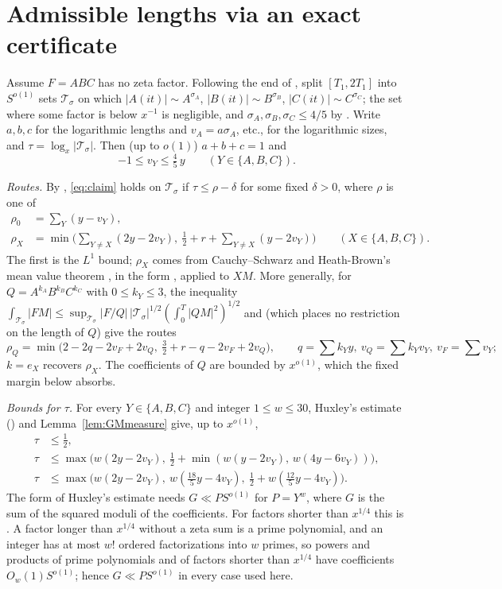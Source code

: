 \documentclass[11pt]{amsart}
\theoremstyle{definition}
\theoremstyle{remark}
\begin{document}
\section{Admissible lengths via an exact certificate}\label{sec:ranges}

Assume $F=ABC$ has no zeta factor. Following the end of \cite[Section~5]{J}, split $[T_1,2T_1]$ into $S^{o(1)}$ sets $\mathcal T_\sigma$ on which $|A(it)|\sim A^{\sigma_A}$, $|B(it)|\sim B^{\sigma_B}$, $|C(it)|\sim C^{\sigma_C}$; the set where some factor is below $x^{-1}$ is negligible, and $\sigma_A,\sigma_B,\sigma_C\le 4/5$ by \cite[Lemma~5.8]{J}. Write $a,b,c$ for the logarithmic lengths and $v_A=a\sigma_A$, etc., for the logarithmic sizes, and $\tau=\log_x|\mathcal T_\sigma|$. Then (up to $o(1)$) $a+b+c=1$ and
\begin{equation}\label{eq:domain}
-1\le v_Y\le \tfrac45\,y\qquad(Y\in\{A,B,C\}).
\end{equation}

\emph{Routes.} By \cite[(5.7), (5.8)]{J}, \eqref{eq:claim} holds on $\mathcal T_\sigma$ if $\tau\le \rho-\delta$ for some fixed $\delta>0$, where $\rho$ is one of
\begin{align*}
\rho_0&=\textstyle\sum_{Y}(y-v_Y),\\
\rho_X&=\min\Big(\textstyle\sum_{Y\ne X}(2y-2v_Y),\ \tfrac12+r+\sum_{Y\ne X}(y-2v_Y)\Big)\qquad(X\in\{A,B,C\}).
\end{align*}
The first is the $L^1$ bound; $\rho_X$ comes from Cauchy--Schwarz and Heath-Brown's mean value theorem \cite{HB-MVT}, in the form \cite[Proposition~2.2]{J}, applied to $XM$. More generally, for $Q=A^{k_A}B^{k_B}C^{k_C}$ with $0\le k_Y\le 3$, the inequality $\int_{\mathcal T_\sigma}|FM|\le\sup_{\mathcal T_\sigma}|F/Q|\,|\mathcal T_\sigma|^{1/2}(\int_0^T|QM|^2)^{1/2}$ and \cite[Proposition~2.2]{J} (which places no restriction on the length of $Q$) give the routes
\[
\rho_Q=\min\big(2-2q-2v_F+2v_Q,\ \tfrac32+r-q-2v_F+2v_Q\big),\qquad q=\textstyle\sum k_Yy,\ v_Q=\sum k_Yv_Y,\ v_F=\sum v_Y;
\]
$k=e_X$ recovers $\rho_X$. The coefficients of $Q$ are bounded by $x^{o(1)}$, which the fixed margin below absorbs.

\emph{Bounds for $\tau$.} For every $Y\in\{A,B,C\}$ and integer $1\le w\le 30$, Huxley's estimate (\cite[Lemma~5.10 and (5.9)]{J}) and Lemma~\ref{lem:GMmeasure} give, up to $x^{o(1)}$,
\begin{align*}
\tau&\le \tfrac12,\\
\tau&\le \max\big(w(2y-2v_Y),\ \tfrac12+\min(w(y-2v_Y),\,w(4y-6v_Y))\big),\\
\tau&\le \max\big(w(2y-2v_Y),\ w(\tfrac{18}{5}y-4v_Y),\ \tfrac12+w(\tfrac{12}{5}y-4v_Y)\big).
\end{align*}
The form \cite[(5.9)]{J} of Huxley's estimate needs $G\ll PS^{o(1)}$ for $P=Y^w$, where $G$ is the sum of the squared moduli of the coefficients. For factors shorter than $x^{1/4}$ this is \cite[Lemma~5.3(ii)]{J}. A factor longer than $x^{1/4}$ without a zeta sum is a prime polynomial, and an integer has at most $w!$ ordered factorizations into $w$ primes, so powers and products of prime polynomials and of factors shorter than $x^{1/4}$ have coefficients $O_w(1)S^{o(1)}$; hence $G\ll PS^{o(1)}$ in every case used here.
\end{document}
